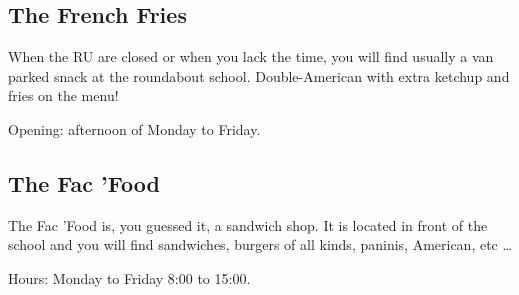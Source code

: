 


\subsection{The French Fries}
When the RU are closed or when you lack the time, you will find usually a van parked snack at the roundabout school.
Double-American with extra ketchup and fries on the menu!

Opening: afternoon of Monday to Friday.




\subsection{The Fac 'Food}

The Fac 'Food is, you guessed it, a sandwich shop. It is located in front of the school and you will find sandwiches, burgers of all kinds, paninis, American, etc \dots

Hours: Monday to Friday 8:00 to 15:00.



